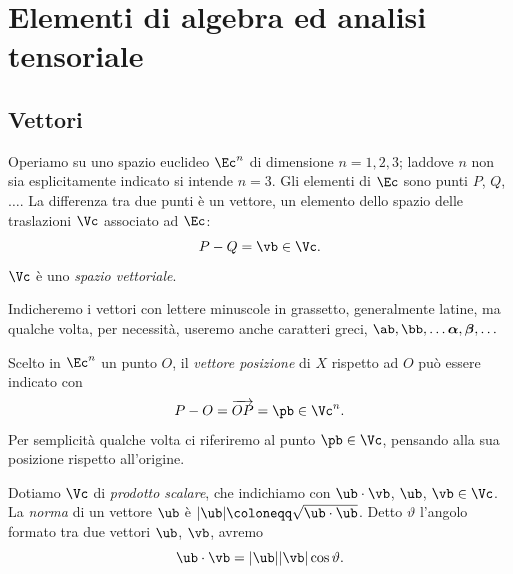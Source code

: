 \setcounter{chapter}{0}
\chapter{Elementi di algebra ed analisi tensoriale}

\renewcommand{\thesection}{A.\arabic{section}}
\setcounter{section}{0} %



\renewcommand{\theequation}{A\arabic{equation}}
\setcounter{equation}{0} %



\section{Vettori}
Operiamo su uno spazio euclideo $\Ec^n$ di dimensione $n=1,2,3$; laddove $n$ non sia esplicitamente indicato si intende $n=3$. Gli elementi di $\Ec$ sono punti $P$, $Q$, $\ldots$. La differenza tra due punti è un vettore, un elemento dello spazio delle traslazioni $\Vc$ associato ad $\Ec$:
\begin{equation}
	P-Q=\vb \in \Vc.
\end{equation}
$\Vc$ è uno \textit{spazio vettoriale}.

Indicheremo i vettori con lettere minuscole in grassetto, generalmente latine, ma qualche volta, per necessità, useremo anche caratteri greci, $\ab, \bb, \ldots \boldsymbol{\alpha}, \boldsymbol{\beta}, \ldots$

Scelto in $\Ec^n$ un punto $O$, il \textit{vettore posizione} di $X$ rispetto ad $O$ può essere indicato con
\begin{equation}
P-O=\overrightarrow{OP}=\pb\in \Vc^n.
\end{equation}
Per semplicità qualche volta ci riferiremo al punto $\pb\in \Vc$, pensando alla sua posizione rispetto all'origine.

Dotiamo $\Vc$ di \textit{prodotto scalare}, che indichiamo con $\ub\cdot \vb$, $\ub$, $\vb\in\Vc$.
La \textit{norma} di un vettore $\ub$ è $|\ub|\coloneqq \sqrt{\ub\cdot\ub}$. Detto $\vartheta$ l'angolo formato tra due vettori $\ub$, $\vb$, avremo
\begin{equation}
\ub \cdot \vb =|\ub||\vb|\cos \vartheta.
\end{equation}

